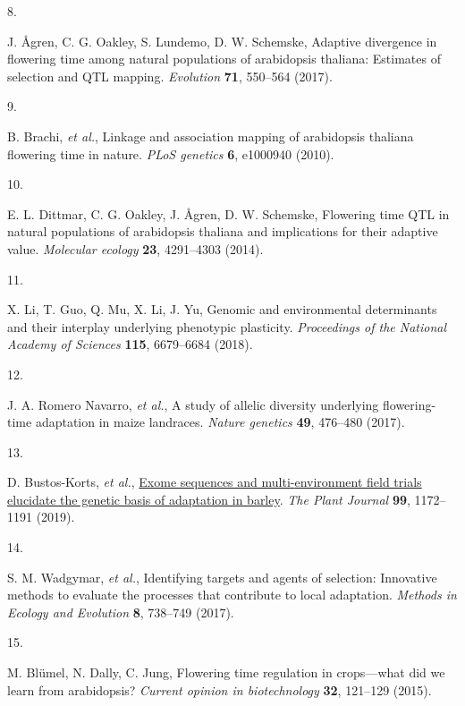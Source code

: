 \documentclass[
  9pt,
  twocolumn,
  twoside]{pnas-new}
\newlength{\cslhangindent}
\newlength{\csllabelwidth}
\newenvironment{CSLReferences}[2] %
 {\begin{list}{}{%
  \setlength{\itemindent}{0pt}
  \setlength{\leftmargin}{0pt}
  \setlength{\parsep}{0pt}
  \ifodd #1
   \setlength{\leftmargin}{\cslhangindent}
   \setlength{\itemindent}{-1\cslhangindent}
  \fi
  \setlength{\itemsep}{#2\baselineskip}}}
 {\end{list}}
\newcommand{\CSLLeftMargin}[1]{\parbox[t]{\csllabelwidth}{\strut#1\strut}}
\newcommand{\CSLRightInline}[1]{\parbox[t]{\linewidth - \csllabelwidth}{\strut#1\strut}}
\begin{document}
\begin{CSLReferences}{0}{1}
\CSLLeftMargin{8. }%
\CSLRightInline{J. Ågren, C. G. Oakley, S. Lundemo, D. W. Schemske,
Adaptive divergence in flowering time among natural populations of
arabidopsis thaliana: Estimates of selection and QTL mapping.
\emph{Evolution} \textbf{71}, 550--564 (2017).}

\CSLLeftMargin{9. }%
\CSLRightInline{B. Brachi, \emph{et al.}, Linkage and association
mapping of arabidopsis thaliana flowering time in nature. \emph{PLoS
genetics} \textbf{6}, e1000940 (2010).}

\CSLLeftMargin{10. }%
\CSLRightInline{E. L. Dittmar, C. G. Oakley, J. Ågren, D. W. Schemske,
Flowering time QTL in natural populations of arabidopsis thaliana and
implications for their adaptive value. \emph{Molecular ecology}
\textbf{23}, 4291--4303 (2014).}

\CSLLeftMargin{11. }%
\CSLRightInline{X. Li, T. Guo, Q. Mu, X. Li, J. Yu, Genomic and
environmental determinants and their interplay underlying phenotypic
plasticity. \emph{Proceedings of the National Academy of Sciences}
\textbf{115}, 6679--6684 (2018).}

\CSLLeftMargin{12. }%
\CSLRightInline{J. A. Romero Navarro, \emph{et al.}, A study of allelic
diversity underlying flowering-time adaptation in maize landraces.
\emph{Nature genetics} \textbf{49}, 476--480 (2017).}

\CSLLeftMargin{13. }%
\CSLRightInline{D. Bustos-Korts, \emph{et al.},
\href{https://doi.org/10.1111/tpj.14414}{Exome sequences and
multi{-}environment field trials elucidate the genetic basis of
adaptation in barley}. \emph{The Plant Journal} \textbf{99}, 1172--1191
(2019).}

\CSLLeftMargin{14. }%
\CSLRightInline{S. M. Wadgymar, \emph{et al.}, Identifying targets and
agents of selection: Innovative methods to evaluate the processes that
contribute to local adaptation. \emph{Methods in Ecology and Evolution}
\textbf{8}, 738--749 (2017).}

\CSLLeftMargin{15. }%
\CSLRightInline{M. Blümel, N. Dally, C. Jung, Flowering time regulation
in crops---what did we learn from arabidopsis? \emph{Current opinion in
biotechnology} \textbf{32}, 121--129 (2015).}


\end{CSLReferences}
\end{document}

